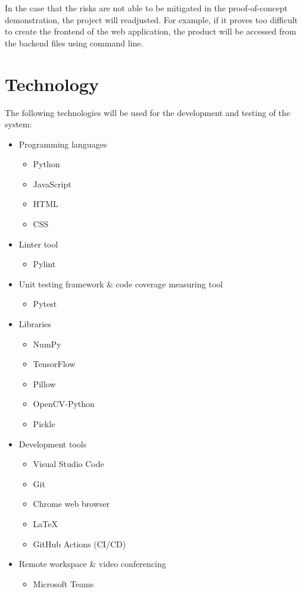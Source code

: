 \documentclass{article}
\begin{document}
In the case that the risks are not able to be mitigated in the proof-of-concept demonstration, the project will readjusted. For example, if it proves too difficult to create the frontend of the web application, the product will be accessed from the backend files using command line.

\section{Technology}

The following technologies will be used for the development and testing of the system:
\begin{itemize}
	\item Programming languages
	\begin{itemize}
		\item Python
		\item JavaScript
		\item HTML
		\item CSS
	\end{itemize}
	\item Linter tool
	\begin{itemize}
		\item Pylint
	\end{itemize}
	\item Unit testing framework \& code coverage measuring tool
	\begin{itemize}
		\item Pytest
	\end{itemize}
	\item Libraries
	\begin{itemize}
		\item NumPy
		\item TensorFlow
		\item Pillow
		\item OpenCV-Python
		\item Pickle
	\end{itemize}
	\item Development tools
	\begin{itemize}
		\item Visual Studio Code
		\item Git
		\item Chrome web browser
		\item \LaTeX
		\item GitHub Actions (CI/CD)
	\end{itemize}
	\item Remote workspace \& video conferencing
	\begin{itemize}
		\item Microsoft Teams
	\end{itemize}
\end{itemize}
\end{document}
